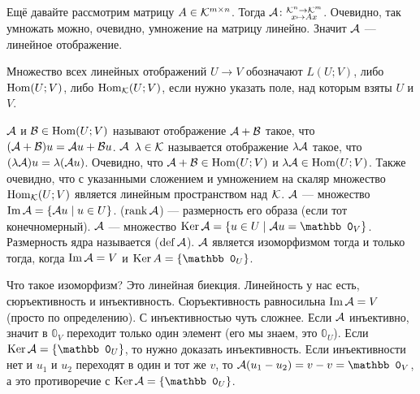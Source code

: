 \documentclass{article}
\DeclareMathOperator{\operIm}{Im}
\let\Im\operIm
\begin{document}
\begin{itemize}
\begin{Example}
            Ещё давайте рассмотрим матрицу $A\in{\mathcal{K}}^{m\times n}$. Тогда ${\mathcal{A}}\colon\substack{{\mathcal{K}}^n\to{\mathcal{K}}^m\\x\mapsto Ax}$. Очевидно, так умножать можно, очевидно, умножение на матрицу линейно. Значит ${\mathcal{A}}$ --- линейное отображение.
        \end{Example}
        \begin{Comment}
            Множество всех линейных отображений $U\to V$ обозначают $L(U;V)$, либо $\operatorname{Hom}(U;V)$, либо $\operatorname{Hom}_{\mathcal{K}}(U;V)$, если нужно указать поле, над которым взяты $U$ и $V$.
        \end{Comment}
        \dfn {} ${\mathcal{A}}$ и ${\mathcal{B}}\in\operatorname{Hom}(U;V)$ называют отображение ${\mathcal{A}}+{\mathcal{B}}$ такое, что $({\mathcal{A}}+{\mathcal{B}})u={\mathcal{A}} u+{\mathcal{B}} u$.
        \dfn {} ${\mathcal{A}}$  $\lambda\in{\mathcal{K}}$ называется отображение $\lambda{\mathcal{A}}$ такое, что $(\lambda{\mathcal{A}})u=\lambda({\mathcal{A}} u)$.
        \thm Очевидно, что ${\mathcal{A}}+{\mathcal{B}}\in\operatorname{Hom}(U;V)$ и $\lambda{\mathcal{A}}\in\operatorname{Hom}(U;V)$.
        \thm Также очевидно, что с указанными сложением и умножением на скаляр множество $\operatorname{Hom}_{\mathcal{K}}(U;V)$ является линейным пространством над ${\mathcal{K}}$.
        \dfn {} ${\mathcal{A}}$ --- множество $\Im\scriptA=\{\scriptA u\mid u\in U\}$.
        \dfn {} ($\operatorname{rank}{\mathcal{A}}$) --- размерность его образа (если тот конечномерный).
        \dfn {} ${\mathcal{A}}$ --- множество $\Ker\scriptA=\{u\in U\mid\scriptA u=\mathbb0_V\}$.
        \dfn Размерность ядра называется  ($\operatorname{def}{\mathcal{A}}$).
        \thm ${\mathcal{A}}$ является изоморфизмом тогда и только тогда, когда $\Im\scriptA=V$ и $\Ker A=\{\mathbb0_U\}$.
        \begin{Proof}
            Что такое изоморфизм? Это линейная биекция. Линейность у нас есть, сюръективность и инъективность. Сюръективность равносильна $\Im\scriptA=V$ (просто по определению). С инъективностью чуть сложнее. Если ${\mathcal{A}}$ инъективно, значит в $\mathbb0_V$ переходит только один элемент (его мы знаем, это $\mathbb0_U$). Если $\Ker\scriptA=\{\mathbb0_U\}$, то нужно доказать инъективность. Если инъективности нет и $u_1$ и $u_2$ переходят в один и тот же $v$, то $\scriptA(u_1-u_2)=v-v=\mathbb0_V$, а это противоречие с $\Ker\scriptA=\{\mathbb0_U\}$.
        \end{Proof}

\end{itemize}
\end{document}
